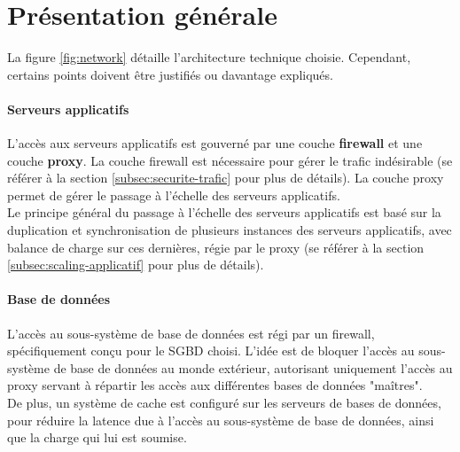 




\section{Présentation générale}

La figure \ref{fig:network} détaille l'architecture technique choisie.
Cependant, certains points doivent être justifiés ou davantage expliqués.

\paragraph{Serveurs applicatifs}

L'accès aux serveurs applicatifs est gouverné par une couche \textbf{firewall}
et une couche \textbf{proxy}. La couche firewall est nécessaire pour gérer le
trafic indésirable (se référer à la section
\ref{subsec:securite-trafic} pour plus de détails). La couche proxy
permet de gérer le passage à l'échelle des serveurs applicatifs. \\

Le principe général du passage à l'échelle des serveurs applicatifs est basé
sur la duplication et synchronisation de plusieurs instances des serveurs
applicatifs, avec balance de charge sur ces dernières, régie par le proxy (se
référer à la section \ref{subsec:scaling-applicatif} pour plus de détails).

\paragraph{Base de données}

L'accès au sous-système de base de données est régi par un firewall,
spécifiquement conçu pour le SGBD choisi. L'idée est de bloquer l'accès au
sous-système de base de données au monde extérieur, autorisant uniquement
l'accès au proxy servant à répartir les accès aux différentes bases de données
"maîtres". \\

De plus, un système de cache est configuré sur les serveurs de bases de données,
pour réduire la latence due à l'accès au sous-système de base de données, ainsi que
la charge qui lui est soumise.

